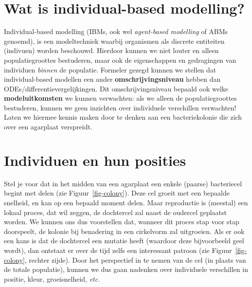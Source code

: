 \documentclass[
  a4paper,
]{scrbook}
\theoremstyle{definition}
\theoremstyle{remark}
\begin{document}
\section{Wat is individual-based
modelling?}\label{wat-is-individual-based-modelling}

Individual-based modelling (IBMs, ook wel \emph{agent-based modelling}
of ABMs genoemd), is een modeltechniek waarbij organismen als discrete
entiteiten (indivuen) worden beschouwd. Hierdoor kunnen we niet louter
en alleen populatiegroottes bestuderen, maar ook de eigenschappen en
gedragingen van individuen \emph{binnen} de populatie. Formeler gezegd
kunnen we stellen dat individual-based modellen een ander
\textbf{omschrijvingsniveau} hebben dan ODEs/differentievergelijkingen.
Dit omschrijvingsniveau bepaald ook welke \textbf{modeluitkomsten} we
kunnen verwachten: als we alleen de populatiegroottes bestuderen, kunnen
we geen inzichten over individuele verschillen verwachten! Laten we
hiermee kennis maken door te denken aan een bacteriekolonie die zich
over een agarplaat verspreidt.

\section{Individuen en hun posities}\label{individuen-en-hun-posities}

Stel je voor dat in het midden van een agarplaat een enkele (paarse)
bacteriecel begint met delen (zie Figuur~\ref{fig-colony}). Deze cel
groeit met een bepaalde snelheid, en kan op een bepaald moment delen.
Maar reproductie is (meestal) een lokaal proces, dat wil zeggen, de
dochtercel zal naast de oudercel geplaatst worden. We kunnen ons dus
voorstellen dat, wanneer dit proces stap voor stap doorspeelt, de
kolonie bij benadering in een cirkelvorm zal uitgroeien. Als er ook een
kans is dat de dochtercel een mutatie heeft (waardoor deze bijvoorbeeld
geel wordt), dan ontstaat er over de tijd zelfs een interessant patroon
(zie Figuur~\ref{fig-colony}, rechter zijde). Door het perspectief in te
nemen van de cel (in plaats van de totale populatie), kunnen we dus gaan
nadenken over individuele verschillen in positie, kleur, groeisnelheid,
\emph{etc.}
\end{document}

